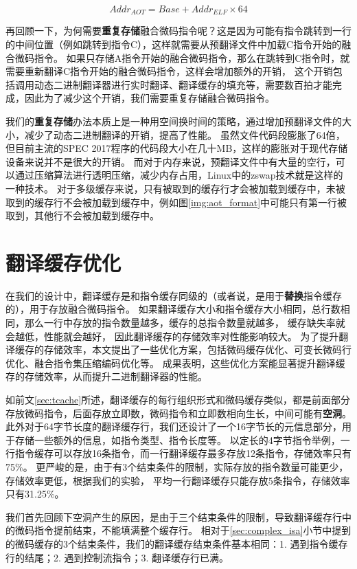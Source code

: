\begin{equation}
Addr_{AOT} = Base +  Addr_{ELF} \times 64 
\end{equation}

再回顾一下，为何需要\textbf{重复存储}融合微码指令呢？这是因为可能有指令跳转到一行的中间位置（例如跳转到指令C），这样就需要从预翻译文件中加载C指令开始的融合微码指令。
如果只存储A指令开始的融合微码指令，那么在跳转到C指令时，就需要重新翻译C指令开始的融合微码指令，这样会增加额外的开销，
这个开销包括调用动态二进制翻译器进行实时翻译、翻译缓存的填充等，需要数百拍才能完成，因此为了减少这个开销，我们需要重复存储融合微码指令。


我们的\textbf{重复存储}办法本质上是一种用空间换时间的策略，通过增加预翻译文件的大小，减少了动态二进制翻译的开销，提高了性能。
虽然文件代码段膨胀了64倍，但目前主流的SPEC 2017程序的代码段大小在几十MB，这样的膨胀对于现代存储设备来说并不是很大的开销。
而对于内存来说，预翻译文件中有大量的空行，可以通过压缩算法进行透明压缩，减少内存占用，Linux中的zswap技术就是这样的一种技术。
对于多级缓存来说，只有被取到的缓存行才会被加载到缓存中，未被取到的缓存行不会被加载到缓存中，例如图\ref{img:aot_format}中可能只有第一行被取到，其他行不会被加载到缓存中。


\section{翻译缓存优化}

在我们的设计中，翻译缓存是和指令缓存同级的（或者说，是用于\textbf{替换}指令缓存的），用于存放融合微码指令。
如果翻译缓存大小和指令缓存大小相同，总行数相同，那么一行中存放的指令数量越多，缓存的总指令数量就越多，
缓存缺失率就会越低，性能就会越好，
因此翻译缓存的存储效率对性能影响较大。
为了提升翻译缓存的存储效率，本文提出了一些优化方案，包括微码缓存优化、可变长微码行优化、融合指令集压缩编码优化等。
成果表明，这些优化方案能显著提升翻译缓存的存储效率，从而提升二进制翻译器的性能。

如前文\ref{sec:tcache}所述，翻译缓存的每行组织形式和微码缓存类似，都是前面部分存放微码指令，后面存放立即数，微码指令和立即数相向生长，中间可能有\textbf{空洞}。
此外对于64字节长度的翻译缓存行，我们还设计了一个16字节长的元信息部分，用于存储一些额外的信息，如指令类型、指令长度等。
以定长的4字节指令举例，一行指令缓存可以存放16条指令，而一行翻译缓存最多存放12条指令，存储效率只有75\%。
更严峻的是，由于有3个结束条件的限制，实际存放的指令数量可能更少，存储效率更低，根据我们的实验，
平均一行翻译缓存只能存放5条指令，存储效率只有31.25\%。

我们首先回顾下空洞产生的原因，是由于三个结束条件的限制，导致翻译缓存行中的微码指令提前结束，不能填满整个缓存行。
相对于\ref{sec:complex_isa}小节中提到的微码缓存的3个结束条件，我们的翻译缓存结束条件基本相同：1. 遇到指令缓存行的结尾；2. 遇到控制流指令；3. 翻译缓存行已满。


